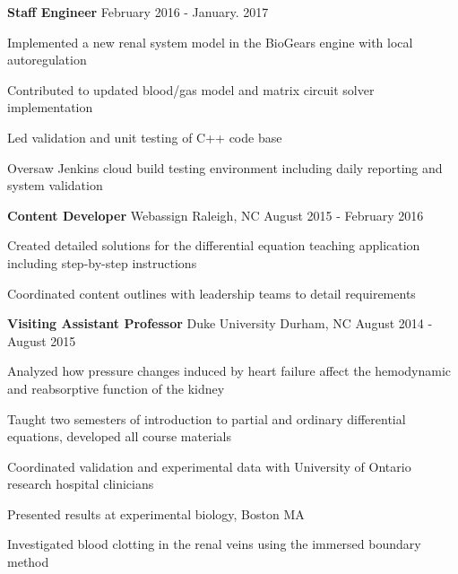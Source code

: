 \begin{cventries}
  \cventry
    {\textbf{Staff Engineer}}%
    {} %
    {} %
    {February 2016 - January. 2017} %
    {
      \begin{cvitems} %
        \item {Implemented a new renal system model in the BioGears engine with local autoregulation}
        \item {Contributed to updated blood/gas model and matrix circuit solver implementation}
        \item {Led validation and unit testing of C++ code base}
        \item {Oversaw Jenkins cloud build testing environment including daily reporting and system validation}
      \end{cvitems}
    }

  \cventry
    {\textbf{Content Developer}} %
    {Webassign} %
    {Raleigh, NC} %
    {August 2015 - February 2016} %
    {
      \begin{cvitems} %
        \item {Created detailed solutions for the differential equation teaching application including step-by-step instructions}
        \item {Coordinated content outlines with leadership teams to detail requirements}
      \end{cvitems}
    }

  \cventry
    {\textbf{Visiting Assistant Professor}} %
    {Duke University} %
    {Durham, NC} %
    {August 2014 - August 2015} %
    {
      \begin{cvitems} %
        \item {Analyzed how pressure changes induced by heart failure affect the hemodynamic and reabsorptive
function of the kidney}
		    \item {Taught two semesters of introduction to partial and ordinary differential equations, developed all course materials}
        \item {Coordinated validation and experimental data with University of Ontario research hospital clinicians}
        \item {Presented results at experimental biology, Boston MA}
        \item {Investigated blood clotting in the renal veins using the immersed boundary method}
      \end{cvitems}
    }


\end{cventries}
